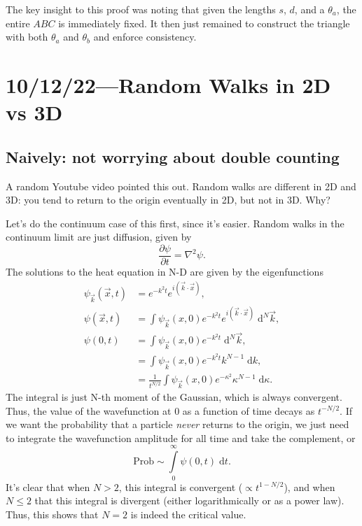 \documentclass[12pt]{report}
\newcommand*{\pd}[2]{\frac{\partial#1}{\partial#2}}
\newcommand*{\p}[1]{\left(#1\right)}
\begin{document}
The key insight to this proof was noting that given the lengths $s$, $d$, and a
$\theta_a$, the entire $ABC$ is immediately fixed. It then just remained to
construct the triangle with both $\theta_a$ and $\theta_b$ and enforce
consistency.

\chapter{10/12/22---Random Walks in 2D vs 3D}

\section{Naively: not worrying about double counting}

A random Youtube video pointed this out. Random walks are different in 2D and
3D\@: you tend to return to the origin eventually in 2D, but not in 3D. Why?

Let's do the continuum case of this first, since it's easier. Random walks in
the continuum limit are just diffusion, given by
\begin{equation}
    \pd{\psi}{t} = \nabla^2 \psi.
\end{equation}
The solutions to the heat equation in N-D are given by the eigenfunctions
\begin{align}
    \psi_{\vec{k}}(\vec{x}, t) &= e^{-k^2 t} e^{i\p{\vec{k} \cdot \vec{x}}},\\
    \psi(\vec{x}, t) &=
        \int\limits \psi_{\vec{k}}(x, 0)e^{-k^2 t}
            e^{i\p{\vec{k} \cdot \vec{x}}} \;\mathrm{d}^N\vec{k},\\
    \psi(0, t) &=
            \int\limits \psi_{\vec{k}}(x, 0)e^{-k^2 t} \;\mathrm{d}^N\vec{k}
            ,\nonumber\\
        &= \int\limits \psi_{\vec{k}}(x, 0)e^{-k^2 t} k^{N - 1}\;\mathrm{d}k
            ,\nonumber\\
        &= \frac{1}{t^{N/2}}
            \int\limits \psi_{\vec{k}}(x, 0)e^{-\kappa^2} \kappa^{N - 1}
            \;\mathrm{d}\kappa.
\end{align}
The integral is just N-th moment of the Gaussian, which is always convergent.
Thus, the value of the wavefunction at $0$ as a function of time decays as
$t^{-N / 2}$. If we want the probability that a particle \emph{never} returns to
the origin, we just need to integrate the wavefunction amplitude for all time
and take the complement, or
\begin{equation}
    \mathrm{Prob} \sim \int\limits_0^\infty \psi(0, t)\;\mathrm{d}t.
\end{equation}
It's clear that when $N > 2$, this integral is convergent ($\propto t^{1 -
N/2}$), and when $N \leq 2$ that this integral is divergent (either
logarithmically or as a power law). Thus, this shows that $N = 2$ is indeed the
critical value.
\end{document}
